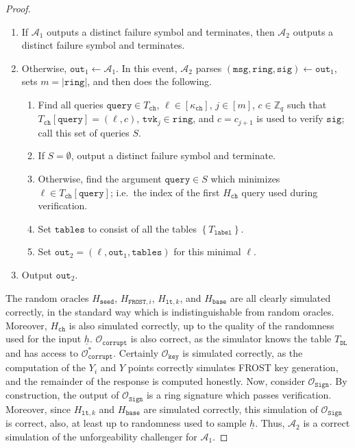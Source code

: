 \documentclass[11pt]{article}
\theoremstyle{definition}
\newcommand{\lt}{\texttt{lt}}
\newcommand{\tvk}{\texttt{tvk}}
\newcommand{\ring}{\texttt{ring}}
\newcommand{\sig}{\texttt{sig}}
\newcommand{\Zq}{\mathbb{Z}_q}
\newcommand{\msg}{\texttt{msg}}
\newcommand{\sign}{\texttt{Sign}}
\newcommand{\corruptionOracle}{\mathcal{O}_{\texttt{corrupt}}}
\newcommand{\signingOracle}{\mathcal{O}_{\sign}}
\newcommand{\keyOracle}{\mathcal{O}_{\texttt{key}}}
\begin{document}
\begin{proof}
\begin{enumerate}
\item If $\mathcal{A}_1$ outputs a distinct failure symbol and terminates, then $\mathcal{A}_2$ outputs a distinct failure symbol and terminates.
\item Otherwise, $\texttt{out}_{1} \leftarrow \mathcal{A}_1$. In this event, $\mathcal{A}_2$ parses $(\msg, \ring, \sig) \leftarrow \texttt{out}_1$, sets $m = \left|\ring\right|$, and then does the following.
\begin{enumerate}
\item Find all queries $\texttt{query} \in T_{\texttt{ch}}$, $\ell \in [\kappa_{\texttt{ch}}]$, $j \in [m]$, $c\in\Zq$ such that $T_{\texttt{ch}}[\texttt{query}]=(\ell, c)$, $\tvk_j \in \ring$, and $c=c_{j+1}$ is used to verify $\sig$; call this set of queries $S$.
\item \label{step:whereA2fails} If $S = \emptyset$, output a distinct failure symbol and terminate.
\item Otherwise, find the argument $\texttt{query} \in S$ which minimizes $\ell \in T_{\texttt{ch}}[\texttt{query}]$; i.e.\ the index of the first $H_{\texttt{ch}}$ query used during verification.
\item Set $\texttt{tables}$ to consist of all the tables $\left\{T_{\texttt{label}}\right\}$.
\item Set $\texttt{out}_2 = (\ell, \texttt{out}_1, \texttt{tables})$ for this minimal $\ell$.
\end{enumerate}
\item Output $\texttt{out}_2$.
\end{enumerate}

The random oracles $H_{\texttt{seed}}$, $H_{\texttt{FROST}, i}$, $H_{\lt, k}$, and $H_{\texttt{base}}$ are all clearly simulated correctly, in the standard way which is indistinguishable from random oracles.  Moreover, $H_{\texttt{ch}}$ is also simulated correctly, up to the quality of the randomness used for the input $\underline{h}$. $\corruptionOracle$ is also correct, as the simulator knows the table $T_{\texttt{DL}}$ and has access to $\corruptionOracle^*$. 
Certainly $\keyOracle$ is simulated correctly, as the computation of the $Y_i$ and $Y$ points correctly simulates FROST key generation, and the remainder of the response is computed honestly.
Now, consider $\signingOracle$. By construction, the output of $\signingOracle$ is a ring signature which passes verification. Moreover, since $H_{\lt,k}$ and $H_{\texttt{base}}$ are simulated correctly, this simulation of $\signingOracle$ is correct, also, at least up to randomness used to sample $\underline{h}$.
Thus, $\mathcal{A}_2$ is a correct simulation of the unforgeability challenger for $\mathcal{A}_1$.


\end{proof}
\end{document}
